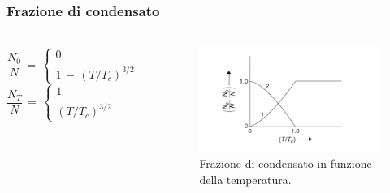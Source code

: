 \begin{frame}
  \frametitle{Frazione di condensato}
  \framesubtitle{}

  \begin{columns}
      \begin{column}{0.5\textwidth}
        $$
        \frac{N_0}{N}\,=\,
        \begin{cases}
        0 \qquad \qquad \qquad \qquad T \geq T_c \\
        1\,-\,\left(T/T_c\right)^{3/2} \qquad \,T < T_c
        \end{cases}
        $$
        $$
        \frac{N_T}{N}\,=\,
        \begin{cases}
        1 \qquad \qquad \qquad \qquad T \geq T_c \\
        \left(T/T_c\right)^{3/2} \qquad \qquad \,\,T < T_c
        \end{cases}
        $$
      \end{column}
      
      \begin{column}{0.5\textwidth}
        \begin{figure}
            \includegraphics[width=\textwidth]{Immagini/frazCond.png}
            \caption{Frazione di condensato in funzione della temperatura.}
        \end{figure}
      \end{column}
    \end{columns}

\end{frame}


